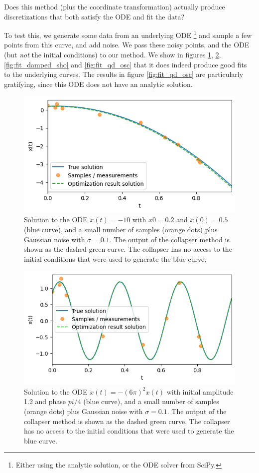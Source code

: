 \documentclass{article}
\begin{document}
Does this method (plus the coordinate transformation) actually produce discretizations that both satisfy the ODE and fit the data?

To test this, we generate some data from an underlying ODE%
\footnote{
Either using the analytic solution, or the ODE solver from SciPy.
}
and sample a few points from this curve, and add noise.
We pass these noisy points, and the ODE (but \emph{not} the initial conditions) to our method.
We show in figures \ref{fig:fit_const_acc}, \ref{fig:fit_sho}, \ref{fig:fit_damped_sho} and \ref{fig:fit_qd_osc} that it does indeed produce good fits to the underlying curves.
The results in figure \ref{fig:fit_qd_osc} are particularly gratifying, since this ODE does not have an analytic solution.

\begin{figure}
\includegraphics{images/results/fit_const_acc.png}
\centering
\caption{
Solution to the ODE $\ddot{x}(t) = -10$ with $x{0} = 0.2$ and $\dot{x}(0) = 0.5$ (blue curve), and a small number of samples (orange dots) plus Gaussian noise with $\sigma = 0.1$.
The output of the collapser method is shown as the dashed green curve.
The collapser has no access to the initial conditions that were used to generate the blue curve.
}
\label{fig:fit_const_acc}
\end{figure}

\begin{figure}
\includegraphics{images/results/fit_sho.png}
\centering
\caption{
Solution to the ODE $\ddot{x}(t) = - (6\pi)^2 x(t)$ with initial amplitude 1.2 and phase $pi/4$ (blue curve), and a small number of samples (orange dots) plus Gaussian noise with $\sigma = 0.1$.
The output of the collapser method is shown as the dashed green curve.
The collapser has no access to the initial conditions that were used to generate the blue curve.
}
\label{fig:fit_sho}
\end{figure}
\end{document}

